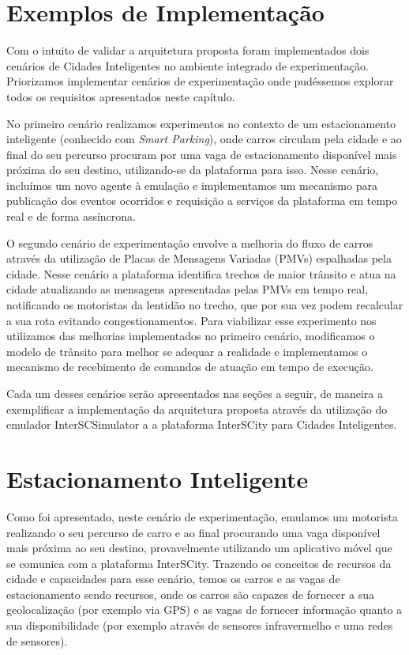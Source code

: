 \section{Exemplos de Implementação}

Com o intuito de validar a arquitetura proposta foram implementados dois cenários de Cidades Inteligentes no ambiente integrado de experimentação.
Priorizamos implementar cenários de experimentação onde pudéssemos explorar todos os requisitos apresentados neste capítulo.

No primeiro cenário realizamos experimentos no contexto de um estacionamento inteligente (conhecido com \textit{Smart Parking}), onde carros circulam pela cidade e ao
final do seu percurso procuram por uma vaga de estacionamento disponível mais próxima do seu destino, utilizando-se da plataforma para isso.
Nesse cenário, incluímos um novo agente à emulação e implementamos um mecanismo para publicação dos eventos ocorridos e requisição a serviços da plataforma em tempo real
e de forma assíncrona.

O segundo cenário de experimentação envolve a melhoria do fluxo de carros através da utilização de Placas de Mensagens Variadas (PMVs) espalhadas pela cidade.
Nesse cenário a plataforma identifica trechos de maior trânsito e atua na cidade atualizando as mensagens apresentadas pelas PMVs em tempo real, notificando os
motoristas da lentidão no trecho, que por sua vez podem recalcular a sua rota evitando congestionamentos.
Para viabilizar esse experimento nos utilizamos das melhorias implementados no primeiro cenário, modificamos o modelo de trânsito para melhor se adequar a realidade e
implementamos o mecanismo de recebimento de comandos de atuação em tempo de execução.

Cada um desses cenários serão apresentados nas seções a seguir, de maneira a exemplificar a implementação da arquitetura proposta através da utilização do emulador
InterSCSimulator a a plataforma InterSCity para Cidades Inteligentes.

\section{Estacionamento Inteligente}

Como foi apresentado, neste cenário de experimentação, emulamos um motorista realizando o seu percurso de carro e ao final procurando uma vaga disponível mais próxima ao
seu destino, provavelmente utilizando um aplicativo móvel que se comunica com a plataforma InterSCity.
Trazendo os conceitos de recursos da cidade e capacidades para esse cenário, temos os carros e as vagas de estacionamento sendo recursos, onde os carros são capazes de
fornecer a sua geolocalização (por exemplo via GPS) e as vagas de fornecer informação quanto a sua disponibilidade (por exemplo através de sensores infravermelho e uma
redes de sensores).

